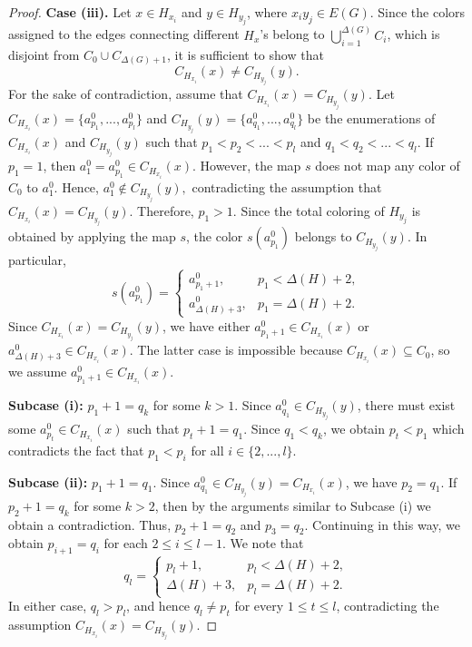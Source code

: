 \documentclass[12pt]{article}
\theoremstyle{definition}
\begin{document}
\begin{proof}
\noindent
\textbf{Case (iii).} Let $x\in H_{x_i}$ and $y\in H_{y_j}$, where $x_iy_j\in E(G)$. Since the colors assigned to the edges connecting different $H_{x}$'s belong to $\bigcup\limits_{i=1}^{\Delta(G)}C_i$, which is disjoint from $C_0\cup C_{\Delta(G)+1}$, it is sufficient to show that
\[
C_{H_{x_i}}(x)\neq C_{H_{y_j}}(y).
\]
For the sake of contradiction, assume that
$
C_{H_{x_i}}(x)=C_{H_{y_j}}(y)
$.
Let $C_{H_{x_i}}(x)=\{a^0_{p_1},...,a^0_{p_l}\}$ 
and 
$C_{H_{y_j}}(y)=\{a^0_{q_1},...,a^0_{q_l}\}$ be the enumerations of $C_{H_{x_i}}(x)$ and $C_{H_{y_j}}(y)$ such that $p_1<p_2<...<p_l$ and $q_1<q_2<...<q_l$. 
If $p_1=1$, then $a^0_1=a^0_{p_1}\in C_{H_{x_i}}(x)$. However, the map $s$ does not map any color of $C_0$ to $a^0_1$. Hence,
$
a^0_1\notin C_{H_{y_j}}(y),
$
contradicting the assumption that
$
C_{H_{x_i}}(x)=C_{H_{y_j}}(y).
$
Therefore, $p_1>1$. 
Since the total coloring of $H_{y_j}$ is obtained by applying the
map $s$, the color $s(a^0_{p_1})$ belongs to
$C_{H_{y_j}}(y)$. In particular,
\[
s(a^0_{p_1})=
\begin{cases}
a^0_{p_1+1},&p_1<\Delta(H)+2,\\
a^0_{\Delta(H)+3},&p_1=\Delta(H)+2.
\end{cases}
\]
Since $C_{H_{x_i}}(x)=C_{H_{y_j}}(y)$, we have either $a^0_{p_1+1}\in C_{H_{x_i}}(x)$ or $a^0_{\Delta(H)+3}\in C_{H_{x_i}}(x)$. The latter case is impossible because 
$C_{H_{x_i}}(x)\subseteq C_0$,
so we assume $a^0_{p_1+1}\in C_{H_{x_i}}(x)$.


\textbf{Subcase (i):} $p_1+1=q_k$ for some $k>1$. Since $a^{0}_{q_1}\in C_{H_{y_j}}(y)$, there must exist some $a^{0}_{p_t}\in C_{H_{x_i}}(x)$ such that $p_t+1=q_1$. Since $q_1<q_k$, we obtain $p_t<p_1$ which contradicts the fact that $p_1<p_i$ for all $i\in\{2,...,l\}$. 
    \vspace{2mm}

\textbf{Subcase (ii):} $p_1+1=q_1$. Since $a^{0}_{q_1}\in C_{H_{y_j}}(y)=C_{H_{x_i}}(x)$, we have $p_2=q_1$.
    If $p_2+1= q_k$ for some $k>2$, then by the arguments similar to Subcase (i) we obtain a contradiction. Thus, $p_2+1=q_2$ and $p_3=q_2$. Continuing in this way, we obtain $p_{i+1}=q_i$ for each $2\leq i\leq l-1$.
    We note that
\[
q_l=
\begin{cases}
p_{l}+1,& p_l<\Delta(H)+2,\\
\Delta(H)+3,& p_l=\Delta(H)+2.
\end{cases}
\]
In either case, $q_l>p_l$, and hence $q_l\neq p_t$ for every $1\le t\le l$, contradicting the assumption
$
C_{H_{x_i}}(x)=C_{H_{y_j}}(y).
$
\end{proof}
\end{document}
